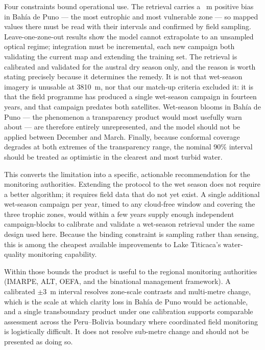 \documentclass[preprint,review,12pt,authoryear]{elsarticle}
\begin{document}
Four constraints bound operational use. The retrieval carries a
\numZoneBahiaDePunoBias~m positive bias in Bah\'ia de Puno --- the most
eutrophic and most vulnerable zone --- so mapped values there must be read
with their intervals and confirmed by field sampling. Leave-one-zone-out
results show the model cannot extrapolate to an unsampled optical regime;
integration must be incremental, each new campaign both validating the
current map and extending the training set. The retrieval is calibrated and validated for
the austral dry season only, and the reason is worth stating precisely
because it determines the remedy. It is not that wet-season imagery is
unusable at 3810~m, nor that our match-up criteria excluded it: it is that
the field programme has produced a single wet-season campaign in fourteen
years, and that campaign predates both satellites. Wet-season blooms in
Bah\'ia de Puno --- the phenomenon a transparency product would most usefully
warn about --- are therefore entirely unrepresented, and the model should not
be applied between December and March. Finally, because conformal coverage
degrades at both extremes of the transparency range, the nominal 90\%
interval should be treated as optimistic in the clearest and most turbid
water.

This converts the limitation into a specific, actionable recommendation for
the monitoring authorities. Extending the protocol to the wet season does not
require a better algorithm; it requires field data that do not yet exist. A
single additional wet-season campaign per year, timed to any cloud-free
window and covering the three trophic zones, would within a few years supply
enough independent campaign-blocks to calibrate and validate a wet-season
retrieval under the same design used here. Because the binding constraint is
sampling rather than sensing, this is among the cheapest available
improvements to Lake Titicaca's water-quality monitoring capability.

Within those bounds the product is useful to the regional monitoring
authorities (IMARPE, ALT, OEFA, and the binational management framework). A
calibrated $\pm3$~m interval resolves zone-scale contrasts and multi-metre
change, which is the scale at which clarity loss in Bah\'ia de Puno would be
actionable, and a single transboundary product under one calibration supports
comparable assessment across the Peru--Bolivia boundary where coordinated
field monitoring is logistically difficult. It does not resolve sub-metre
change and should not be presented as doing so.
\end{document}
